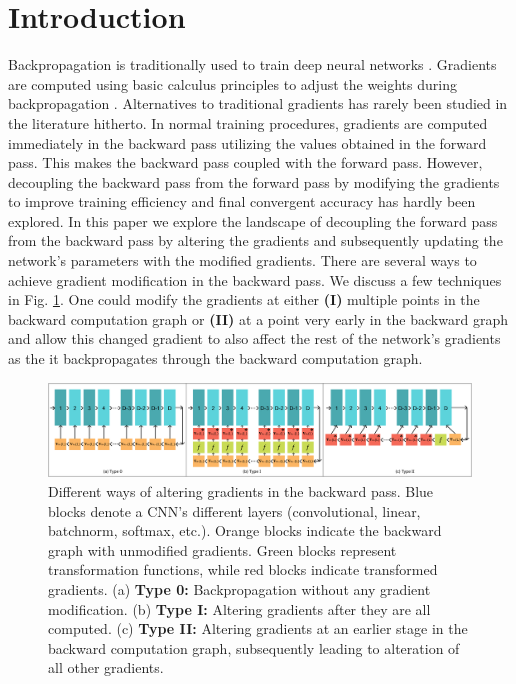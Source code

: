 \documentclass[times,sort&compress]{elsarticle}
\begin{document}
\section{Introduction}
\label{sec:Intr}





Backpropagation is traditionally used to train deep neural networks
\cite{lillicrap2020backpropagation}. Gradients are computed using basic calculus
principles to adjust the weights during backpropagation \cite{lecun1988theoretical}.
Alternatives to traditional gradients has rarely been studied in the literature
hitherto. In normal training procedures, gradients are computed immediately in the
backward pass utilizing the values obtained in the forward pass. This makes the backward
pass coupled with the forward pass. However, decoupling the backward pass from the
forward pass by modifying the gradients to improve training efficiency and final
convergent accuracy has hardly been explored. In this paper we explore the landscape of
decoupling the forward pass from the backward pass by altering the gradients and
subsequently updating the network's parameters with the modified gradients. There are
several ways to achieve gradient modification in the backward pass. We discuss a few
techniques in Fig. \ref{fig:gradient_altering}. One could modify the gradients at either
\textbf{(I)} multiple points in the backward computation graph or \textbf{(II)} at a
point very early in the backward graph and allow this changed gradient to also affect
the rest of the network's gradients as the it backpropagates through the backward
computation graph.



\begin{figure}[t]
\centering
\includegraphics[width=1.0\columnwidth]{PGT_Types}
\caption{ Different ways of altering gradients in the backward pass. Blue blocks denote
a CNN's different layers (convolutional, linear, batchnorm, softmax, etc.). Orange
blocks indicate the backward graph with unmodified gradients. Green blocks represent
transformation functions, while red blocks indicate transformed gradients. (a)
\textbf{Type 0:} Backpropagation without any gradient modification. (b) \textbf{Type I:}
Altering gradients after they are all computed. (c) \textbf{Type II:} Altering gradients
at an earlier stage in the backward computation graph, subsequently leading to
alteration of all other gradients. }
\label{fig:gradient_altering}
\end{figure}
\end{document}
